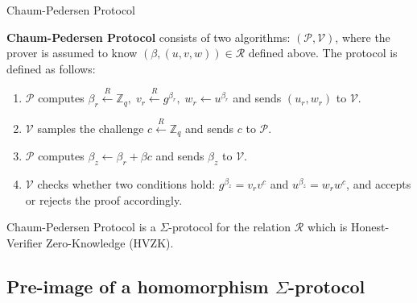 \documentclass[xcolor={usenames,dvipsnames}]{beamer}
\begin{document}
    \begin{frame}{Chaum-Pedersen Protocol}
        \begin{definition}
            \textbf{Chaum-Pedersen Protocol} consists of two algorithms: $(\mathcal{P}, \mathcal{V})$, where the prover is assumed to know $(\beta,(u,v,w)) \in \mathcal{R}$ defined above. The protocol is defined as follows:\pause
            \begin{enumerate}
                \item $\mathcal{P}$ computes $\beta_r \xleftarrow{R} \mathbb{Z}_q, \; v_r \xleftarrow{R} g^{\beta_r}, \; w_r \gets u^{\beta_r}$ and sends $(u_r,w_r)$ to $\mathcal{V}$.\pause
                \item $\mathcal{V}$ samples the challenge $c \xleftarrow{R} \mathbb{Z}_q$ and sends $c$ to $\mathcal{P}$.\pause
                \item $\mathcal{P}$ computes $\beta_z \gets \beta_r + \beta c$ and sends $\beta_z$ to $\mathcal{V}$.\pause
                \item $\mathcal{V}$ checks whether two conditions hold: $g^{\beta_z} = v_rv^c$ and $u^{\beta_z} = w_r w^c$, and accepts or rejects the proof accordingly.\pause
            \end{enumerate}
        \end{definition}
        
        \begin{theorem}
            Chaum-Pedersen Protocol is a $\Sigma$-protocol for the relation $\mathcal{R}$ which is Honest-Verifier Zero-Knowledge (HVZK).
        \end{theorem}
    \end{frame}

    \subsection{Pre-image of a homomorphism $\Sigma$-protocol}
\end{document}
